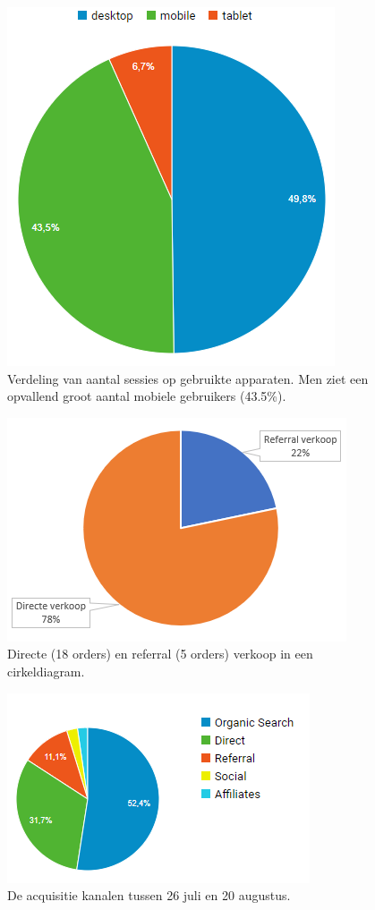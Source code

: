 \begin{figure}
	\includegraphics[scale=0.7]{img/sessies-per-apparaat.png}
	\centering
	\caption{Verdeling van aantal sessies op gebruikte apparaten. Men ziet een opvallend groot aantal mobiele gebruikers (43.5\%).}
	\label{fig:sessies-per-apparaat}
\end{figure}
\begin{figure}
\includegraphics[scale=0.9]{img/directe-referral-verkoop.png}
\centering
\caption{Directe (18 orders) en referral (5 orders) verkoop in een cirkeldiagram.}
\label{fig:directe-referral-verkoop}
\end{figure}
\begin{figure}
	\includegraphics[]{img/acquisitie-kanalen.png}
	\centering
	\caption{De acquisitie kanalen tussen 26 juli en 20 augustus.}
	\label{fig:acquisitie-kanalen}
\end{figure}

